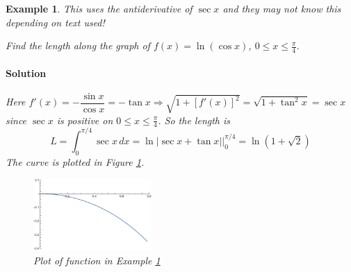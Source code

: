 \documentclass[letterpaper, 11pt, openany]{book}
\theoremstyle{mytheoremstyle}
\theoremstyle{myexamplestyle}
\newtheorem{example}{Example}[section]
\newenvironment{solution}{\paragraph{\sffamily \smaller \fontseries{b}\selectfont Solution}}{\hfill\faSquare}
\begin{document}
\begin{example}\label{e:arc-length-lncos}
    \faExclamationCircle[solid] \; This uses the antiderivative of \(\sec x\) and they may not know this depending on text used!

    Find the length along the graph of \(f(x) = \ln (\cos x)\), \(0 \leq x \leq \frac{\pi}{4}\).

    \begin{solution}
        Here \(f'(x) = -\dfrac{\sin x}{\cos x} = -\tan x \Rightarrow \sqrt{1 + [f'(x)]^{2}} = \sqrt{1 + \tan^{2} x} = \sec x\) since \(\sec x\) is positive on \(0 \leq x \leq \frac{\pi}{4}\). So the length is
        \[
            L = \int_{0}^{\pi/4} \sec x \, dx = \ln |\sec x + \tan x|\Big|_{0}^{\pi /4} = \ln (1 + \sqrt{2})
        \]
    The curve is plotted in Figure \ref{f:arc-length-lncos}.
    \end{solution}
    \begin{figure}[htbp]
        \centering
            \includegraphics[width=0.4\textwidth]{Figures/arclengthlncos.pdf}
        \caption{Plot of function in Example \ref{e:arc-length-lncos}}
        \label{f:arc-length-lncos}
    \end{figure}
\end{example}
\end{document}
